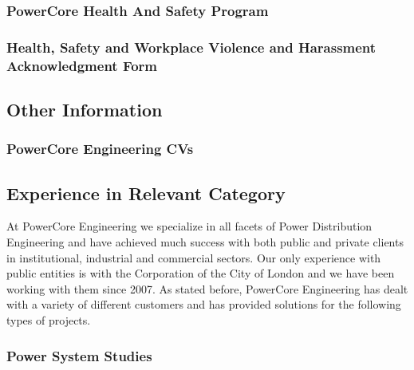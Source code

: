 \subsubsection{PowerCore Health And Safety Program}
\label{Sub:HS:HSP}



\subsubsection{Health, Safety and Workplace Violence and Harassment Acknowledgment Form}
\label{Sub:HS:sig}



\pagebreak
\subsection{Other Information}
\label{Sub:OI}

\subsubsection{PowerCore Engineering CVs}
\label{Sub:OI:CVs}



\pagebreak
\subsection{Experience in Relevant Category}
\label{Sub:Exp}

\noindent At PowerCore Engineering we specialize in all facets of Power Distribution Engineering and have achieved much success with both public and private clients in institutional, industrial and commercial sectors.  Our only experience with public entities is with the Corporation of the City of London and we have been working with them since 2007.  As stated before, PowerCore Engineering has dealt with a variety of different customers and has provided solutions for the following types of projects.

\subsubsection{Power System Studies}
\label{Sub:Exp:PSS}

